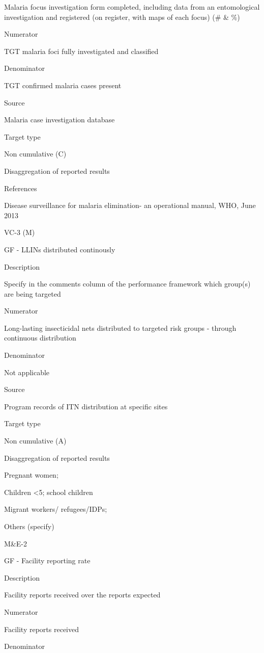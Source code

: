 \documentclass[]{book}
\begin{document}
Malaria focus investigation form completed, including data from an entomological investigation and registered (on register, with maps of each focus) (\# \& \%)

Numerator

TGT malaria foci fully investigated and classified

Denominator

TGT confirmed malaria cases present

Source

Malaria case investigation database

Target type

Non cumulative (C)

Disaggregation of reported results

References

Disease surveillance for malaria elimination- an operational manual, WHO, June 2013

VC-3 (M)

GF - LLINs distributed continously

Description

Specify in the comments column of the performance framework which group(s) are being targeted

Numerator

Long-lasting insecticidal nets distributed to targeted risk groups - through continuous distribution

Denominator

Not applicable

Source

Program records of ITN distribution at specific sites

Target type

Non cumulative (A)

Disaggregation of reported results

Pregnant women;

Children \textless{}5; school children

Migrant workers/ refugees/IDPs;

Others (specify)

M\&E-2

GF - Facility reporting rate

Description

Facility reports received over the reports expected

Numerator

Facility reports received

Denominator
\end{document}
